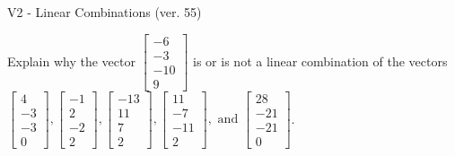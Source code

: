 \begin{exercise}
  \begin{exerciseTitle}V2 - Linear Combinations (ver. 55)\end{exerciseTitle}
  \begin{exerciseStatement}
    Explain why the vector \(\left[\begin{array}{c}
-6 \\
-3 \\
-10 \\
9
\end{array}\right]\)  is or is not a linear 
	combination of the vectors \(\left[\begin{array}{c}
4 \\
-3 \\
-3 \\
0
\end{array}\right] , \left[\begin{array}{c}
-1 \\
2 \\
-2 \\
2
\end{array}\right] , \left[\begin{array}{c}
-13 \\
11 \\
7 \\
2
\end{array}\right] , \left[\begin{array}{c}
11 \\
-7 \\
-11 \\
2
\end{array}\right] , \text{ and } \left[\begin{array}{c}
28 \\
-21 \\
-21 \\
0
\end{array}\right]\).
	



\end{exerciseStatement}
\end{exercise}
